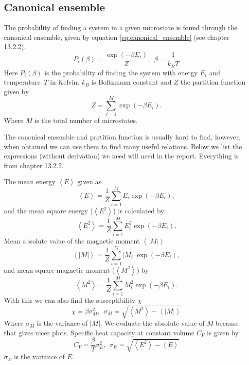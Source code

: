 \documentclass[reprint, english,notitlepage,nofootinbib]{revtex4-1}  %
\begin{document}
\subsection*{Canonical ensemble}
The probability of finding a system in a given microstate is found through the canonical ensemble, given by equation \eqref{eq:canonical_ensemble} (see \cite{lectures2015} chapter 13.2.2).
\begin{equation}
	\label{eq:canonical_ensemble}
	P_i(\beta) = \frac{\exp(-\beta E_i)}{Z},\ \ \beta = \frac{1}{k_BT}
\end{equation}
Here $P_i(\beta)$ is the probability of finding the system with energy $E_i$ and temperature $T$ in Kelvin. $k_B$ is Boltzmann constant and $Z$ the partition function given by
\begin{equation}
	\label{eq:partition_function}
	Z = \sum_{i = 1}^{M}\exp(-\beta E_i).
\end{equation}
Where $M$ is the total number of microstates.

The canonical ensemble and partition function is usually hard to find, however, when obtained we can use them to find many useful relations. Below we list the expressions (without derivation) we need will need in the report. Everything is from \cite{lectures2015} chapter 13.2.2.

The mean energy $\left<E\right>$ given as
\begin{equation}
	\label{eq:expected_energy}
	\left<E\right> = \frac{1}{Z} \sum_{i=1}^{M}E_i\exp(-\beta E_i),
\end{equation}
and the mean square energy ($\left<E^2\right>$) is calculated by
\begin{equation}
	\label{eq:expected_energy_sq}
	\left<E^2\right> = \frac{1}{Z} \sum_{i=1}^{M}E_i^2\exp(-\beta E_i).
\end{equation}
Mean absolute value of the magnetic moment $\left<|M|\right>$
\begin{equation}
	\label{eq:expected_magnetic_moment}
	\left<|M|\right> = \frac{1}{Z} \sum_{i=1}^{M}|M_i|\exp(-\beta E_i),
\end{equation}
and mean square magnetic moment ($\left<M^2\right>$) by
\begin{equation}
\label{eq:expected_magnetic_moment_sq}
\left<M^2\right> = \frac{1}{Z} \sum_{i=1}^{M}M_i^2\exp(-\beta E_i).
\end{equation}
With this we can also find the susceptibility $\chi$
\begin{equation}
	\label{eq:magnetic_susceptibility}
	\chi = \beta \sigma^2_M, \ \ \sigma_M = \sqrt{\left<M^2\right> - \left<|M|\right>}
\end{equation}
Where $\sigma_M$ is the variance of $|M|$. We evaluate the absolute value of $M$ because that gives nicer plots. Specific heat capacity at constant volume $C_V$ is given by
\begin{equation}
	\label{eq:specific_heat_capacity}
	C_V = \frac{\beta}{T}\sigma^2_E, \ \ \sigma_E = \sqrt{\left<E^2\right> - \left<E\right>}
\end{equation}
$\sigma_E$ is the variance of $E$.
\end{document}
